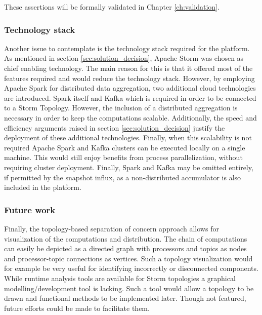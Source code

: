 These assertions will be formally validated in Chapter \ref{ch:validation}.

\subsubsection*{Technology stack}
Another issue to contemplate is the technology stack required for the platform. As mentioned in section \ref{sec:solution_decision}, Apache Storm was chosen as chief enabling technology. The main reason for this is that it offered most of the features required and would reduce the technology stack. However, by employing Apache Spark for distributed data aggregation, two additional cloud technologies are introduced. Spark itself and Kafka which is required in order to be connected to a Storm Topology. However, the inclusion of a distributed aggregation is necessary in order to keep the computations scalable. Additionally, the speed and efficiency arguments raised in section \ref{sec:solution_decision} justify the deployment of these additional technologies. Finally, when this scalability is not required Apache Spark and Kafka clusters can be executed locally on a single machine. This would still enjoy benefits from process parallelization, without requiring cluster deployment. Finally, Spark and Kafka may be omitted entirely, if permitted by the snapshot influx, as a non-distributed accumulator is also included in the platform.

\subsubsection*{Future work}
Finally, the topology-based separation of concern approach allows for visualization of the computations and distribution. The chain of computations can easily be depicted as a directed graph with processors and topics as nodes and processor-topic connections as vertices. Such a topology visualization would for example be very useful for identifying incorrectly or disconnected components. While runtime analysis tools are available for Storm topologies a graphical modelling/development tool is lacking. Such a tool would allow a topology to be drawn and functional methods to be implemented later. Though not featured, future efforts could be made to facilitate them.



	
